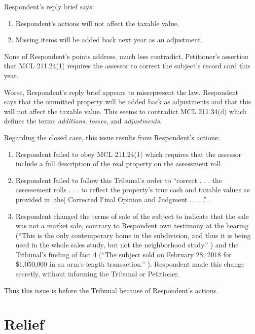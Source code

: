 \documentclass[12pt,\documentclassflag]{michiganCourtOfAppealsBrief}
\begin{document}
Respondent's reply brief says:
\begin{enumerate}
\item Respondent's actions will not affect the taxable value.
\item Missing items will be added back next year as an adjustment.
\end{enumerate}

None of Respondent's points address, much less contradict, Petitioner's assertion that MCL 211.24(1) requires the assessor to correct the subject's record card this year.

Worse, Respondent's reply brief appears to misrepresent the law. Respondent says that the ommitted property will be added back as adjustments and that this will not affect the taxable value. This seems to contradict MCL 211.34(d) which defines the terms \emph{additions}, \emph{losses}, and \emph{adjustments}.




Regarding the closed case, this issue results from Respondent's actions:
  \begin{enumerate}
  \item Respondent failed to obey MCL 211.24(1) which requires that the assessor include a full description of the real property on the assessment roll.
  \item Respondent failed to follow this Tribunal's order to ``correct . . . the assessement rolls . . . to reflect the property's true cash and taxable values as provided in [the] Corrected Final Opinion and Judgment . . . .'' .
  \item Respondent changed the terms of sale of the subject to indicate that the sale was not a market sale, contrary to Respondent own testimony at the hearing (``This is
the only contemporary home in the subdivision, and thus it is being used in the whole
sales study, but not the neighborhood study.'' ) and the Tribunal's finding of fact 4 (``The subject sold on February 28, 2018 for \$1,050,000 in an arm's-length transaction.'' ). Respondent made this change secretly, without informing the Tribunal or Petitioner.
\end{enumerate}
Thus this issue is before the Tribunal because of Respondent's actions.



\section{Relief}
\end{document}

